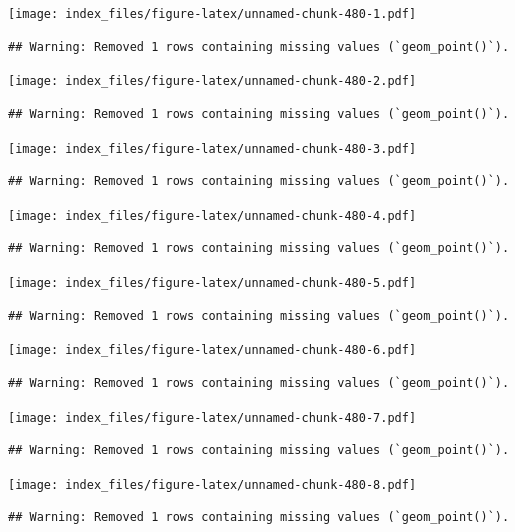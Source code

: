 \documentclass[
]{article}
\begin{document}
\texttt{[image: index\_files/figure-latex/unnamed-chunk-480-1.pdf]}

\begin{verbatim}
## Warning: Removed 1 rows containing missing values (`geom_point()`).
\end{verbatim}

\texttt{[image: index\_files/figure-latex/unnamed-chunk-480-2.pdf]}

\begin{verbatim}
## Warning: Removed 1 rows containing missing values (`geom_point()`).
\end{verbatim}

\texttt{[image: index\_files/figure-latex/unnamed-chunk-480-3.pdf]}

\begin{verbatim}
## Warning: Removed 1 rows containing missing values (`geom_point()`).
\end{verbatim}

\texttt{[image: index\_files/figure-latex/unnamed-chunk-480-4.pdf]}

\begin{verbatim}
## Warning: Removed 1 rows containing missing values (`geom_point()`).
\end{verbatim}

\texttt{[image: index\_files/figure-latex/unnamed-chunk-480-5.pdf]}

\begin{verbatim}
## Warning: Removed 1 rows containing missing values (`geom_point()`).
\end{verbatim}

\texttt{[image: index\_files/figure-latex/unnamed-chunk-480-6.pdf]}

\begin{verbatim}
## Warning: Removed 1 rows containing missing values (`geom_point()`).
\end{verbatim}

\texttt{[image: index\_files/figure-latex/unnamed-chunk-480-7.pdf]}

\begin{verbatim}
## Warning: Removed 1 rows containing missing values (`geom_point()`).
\end{verbatim}

\texttt{[image: index\_files/figure-latex/unnamed-chunk-480-8.pdf]}

\begin{verbatim}
## Warning: Removed 1 rows containing missing values (`geom_point()`).
\end{verbatim}
\end{document}
